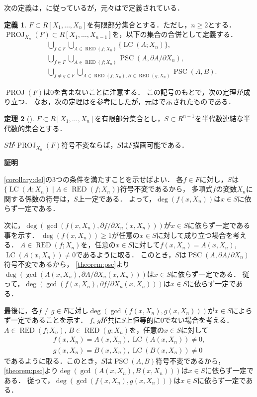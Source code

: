 \documentclass[uplatex, dvipdfmx]{jsarticle}
\makeatletter
\numberwithin{equation}{section}
\renewenvironment{proof}[1][\proofname]{\par
  \pushQED{\qed}%
  \normalfont \topsep6\p@\@plus6\p@\relax
  \trivlist
  \item\relax
  {\bfseries
  #1\@addpunct{.}}\hspace\labelsep\ignorespaces
}{
  \popQED\endtrivlist\@endpefalse
}
\DeclareMathOperator{\PSC}{PSC}
\DeclareMathOperator{\RED}{RED}
\DeclareMathOperator{\LC}{LC}
\DeclareMathOperator{\PROJ}{PROJ}
\theoremstyle{definition}
\newtheorem{definition}{定義}[section]
\newtheorem{theorem}[definition]{定理}
\renewcommand{\proofname}{\textbf{証明}}
\makeatother
\begin{document}
次の定義は，\cite[Section 3]{MR0764184}に従っているが，元々は\cite[Section 2]{MR0403962}で定義されている．
\begin{definition}
$F \subset R[X_1, \dots, X_n]$を有限部分集合とする．ただし，$n \geq 2$とする．
$\PROJ_{X_n}(F) \subset R[X_1, \dots, X_{n-1}]$を，以下の集合の合併として定義する．
\begin{align} 
     &  \bigcup_{f \in F} \bigcup_{A \in \RED(f;X_n)} \{\LC(A;X_n)\},\\
     &  \bigcup_{f \in F} \bigcup_{A \in \RED(f;X_n)} \PSC(A, \partial A / \partial X_n),\\
     &  \bigcup_{f \neq g \in F} \bigcup_{A \in \RED(f;X_n), B \in \RED(g;X_n)} \PSC(A,B).
\end{align}
\end{definition}

$\PROJ(F)$は$0$を含まないことに注意する．
この記号のもとで，次の定理が成り立つ．
なお，次の定理は\cite[Theorem 4]{MR0764184}を参考にしたが，元は\cite[Theorem 5]{MR0403962}で示されたものである．

\begin{theorem}[{\cite[Theorem 4]{MR0764184}}]\label{theorem:inv-deline}
$F \subset R[X_1, \dots, X_n]$を有限部分集合とし，$S \subset R^{n-1}$を半代数連結な半代数的集合とする．

$S$が$\PROJ_{X_n}(F)$符号不変ならば，$S$は$F$描画可能である．
\end{theorem}

\begin{proof}
     \cref{corollary:del}の$3$つの条件を満たすことを示せばよい．
     各$f \in F$に対し，$S$は$\{\LC(A; X_n) \mid A \in \RED(f;X_n) \}$符号不変であるから，
     多項式$f$の変数$X_n$に関する係数の符号は，$S$上一定である．
     よって，$\deg(f(x, X_n))$は$x \in S$に依らず一定である．

     次に，$\deg(\gcd(f(x, X_n), \partial f / \partial X_n(x, X_n)))$が$x \in S$に依らず一定である事を示す．
     $\deg(f(x, X_n)) \geq 1$が任意の$x \in S$に対して成り立つ場合を考える．
     $A \in \RED(f;X_n)$を，任意の$x \in S$に対して$f(x, X_n) = A(x,X_n)$, $\LC(A(x,X_n)) \neq 0$であるように取る．
     このとき，$S$は$\PSC(A, \partial A / \partial X_n)$符号不変であるから，
     \cref{theorem:psc}より$\deg(\gcd(A(x, X_n), \partial A / \partial X_n(x, X_n)))$は$x\in S$に依らず一定である．
     従って，$\deg(\gcd(f(x, X_n), \partial f / \partial X_n(x, X_n)))$は$x\in S$に依らず一定である．
     
     最後に，各$f \neq g \in F$に対し$\deg(\gcd(f(x, X_n),g(x,X_n)))$が$x \in S$によらず一定であることを示す．
     $f$, $g$が共に$S$上恒等的に$0$でない場合を考える．
     $A \in \RED(f;X_n)$, $B \in \RED(g;X_n)$を，任意の$x \in S$に対して
     \begin{align}
          f(x, X_n) = A(x,X_n), \LC(A(x,X_n)) \neq 0,\\
          g(x, X_n) = B(x, X_n), \LC(B(x,X_n)) \neq 0
     \end{align}
     であるように取る．このとき，$S$は$\PSC(A, B)$符号不変であるから，
     \cref{theorem:psc}より$\deg(\gcd(A(x, X_n), B(x, X_n)))$は$x\in S$に依らず一定である．
     従って，$\deg(\gcd(f(x, X_n), g(x, X_n)))$は$x\in S$に依らず一定である．
\end{proof}
\end{document}
